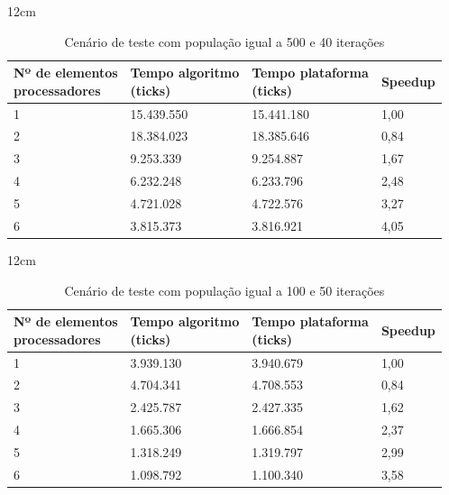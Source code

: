 \begin{table}[h]{12cm}
    \caption{Cenário de teste com população igual a 500 e 40 iterações}
    \label{cenario15}
    \begin{tabular}{llll}
        \hline
        \shortstack[l]{Nº de elementos \\ processadores} & \shortstack[l]{Tempo algoritmo \\ (ticks)} & \shortstack[l]{Tempo plataforma \\ (ticks)} & Speedup \\
        \hline
        1 & 15.439.550 & 15.441.180 & 1,00 \\
        2 & 18.384.023 & 18.385.646 & 0,84 \\
        3 & 9.253.339  & 9.254.887  & 1,67 \\
        4 & 6.232.248  & 6.233.796  & 2,48 \\
        5 & 4.721.028  & 4.722.576  & 3,27 \\
        6 & 3.815.373  & 3.816.921  & 4,05 \\
        \hline
    \end{tabular}
\end{table}


\begin{table}[h]{12cm}
    \caption{Cenário de teste com população igual a 100 e 50 iterações}
    \label{cenario16}
    \begin{tabular}{llll}
        \hline
        \shortstack[l]{Nº de elementos \\ processadores} & \shortstack[l]{Tempo algoritmo \\ (ticks)} & \shortstack[l]{Tempo plataforma \\ (ticks)} & Speedup \\
        \hline
        1 & 3.939.130 & 3.940.679 & 1,00 \\
        2 & 4.704.341 & 4.708.553 & 0,84 \\
        3 & 2.425.787 & 2.427.335 &	1,62 \\
        4 & 1.665.306 & 1.666.854 & 2,37 \\
        5 & 1.318.249 & 1.319.797 & 2,99 \\
        6 & 1.098.792 & 1.100.340 & 3,58 \\
        \hline
    \end{tabular}
\end{table}

